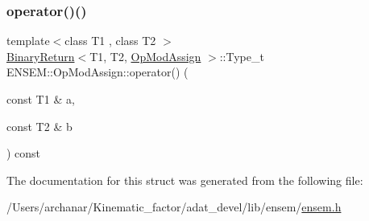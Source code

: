 \mbox{\label{structENSEM_1_1OpModAssign_a3d9009924395ef97f9d281e378953c06}} 
\subsubsection{\texorpdfstring{operator()()}{operator()()}\hspace{0.1cm}{\footnotesize\ttfamily [2/2]}}
{\footnotesize\ttfamily template$<$class T1 , class T2 $>$ \\
\mbox{\hyperlink{structENSEM_1_1BinaryReturn}{Binary\+Return}}$<$T1, T2, \mbox{\hyperlink{structENSEM_1_1OpModAssign}{Op\+Mod\+Assign}} $>$\+::Type\+\_\+t E\+N\+S\+E\+M\+::\+Op\+Mod\+Assign\+::operator() (\begin{DoxyParamCaption}\item[{const T1 \&}]{a,  }\item[{const T2 \&}]{b }\end{DoxyParamCaption}) const\hspace{0.3cm}{\ttfamily [inline]}}



The documentation for this struct was generated from the following file\+:\begin{DoxyCompactItemize}
\item 
/\+Users/archanar/\+Kinematic\+\_\+factor/adat\+\_\+devel/lib/ensem/\mbox{\hyperlink{lib_2ensem_2ensem_8h}{ensem.\+h}}\end{DoxyCompactItemize}
